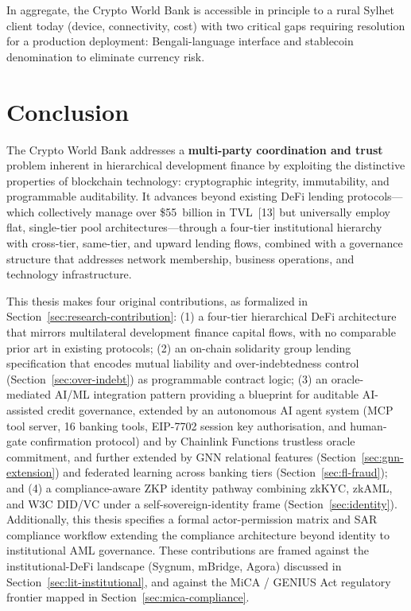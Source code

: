 \documentclass[12pt,a4paper]{report}
\begin{document}
In aggregate, the Crypto World Bank is accessible in principle to a rural Sylhet client today (device, connectivity, cost) with two critical gaps requiring resolution for a production deployment: Bengali-language interface and stablecoin denomination to eliminate currency risk.


\chapter{Conclusion}

The Crypto World Bank addresses a \textbf{multi-party coordination and trust} problem inherent in hierarchical development finance by exploiting the distinctive properties of blockchain technology: cryptographic integrity, immutability, and programmable auditability. It advances beyond existing DeFi lending protocols---which collectively manage over \$55~billion in TVL~[13] but universally employ flat, single-tier pool architectures---through a four-tier institutional hierarchy with cross-tier, same-tier, and upward lending flows, combined with a governance structure that addresses network membership, business operations, and technology infrastructure.

This thesis makes four original contributions, as formalized in Section~\ref{sec:research-contribution}: (1) a four-tier hierarchical DeFi architecture that mirrors multilateral development finance capital flows, with no comparable prior art in existing protocols; (2) an on-chain solidarity group lending specification that encodes mutual liability and over-indebtedness control (Section~\ref{sec:over-indebt}) as programmable contract logic; (3) an oracle-mediated AI/ML integration pattern providing a blueprint for auditable AI-assisted credit governance, extended by an autonomous AI agent system (MCP tool server, 16 banking tools, EIP-7702 session key authorisation, and human-gate confirmation protocol) and by Chainlink Functions trustless oracle commitment, and further extended by GNN relational features (Section~\ref{sec:gnn-extension}) and federated learning across banking tiers (Section~\ref{sec:fl-fraud}); and (4) a compliance-aware ZKP identity pathway combining zkKYC, zkAML, and W3C DID/VC under a self-sovereign-identity frame (Section~\ref{sec:identity}). Additionally, this thesis specifies a formal actor-permission matrix and SAR compliance workflow extending the compliance architecture beyond identity to institutional AML governance. These contributions are framed against the institutional-DeFi landscape (Sygnum, mBridge, Agora) discussed in Section~\ref{sec:lit-institutional}, and against the MiCA / GENIUS Act regulatory frontier mapped in Section~\ref{sec:mica-compliance}.
\end{document}
